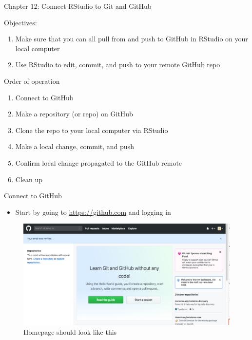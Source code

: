 \documentclass[
  ignorenonframetext,
]{beamer}
\providecommand{\tightlist}{%
  \setlength{\itemsep}{0pt}\setlength{\parskip}{0pt}}
\begin{document}
\begin{frame}{Chapter 12: Connect RStudio to Git and GitHub}
\protect\hypertarget{chapter-12-connect-rstudio-to-git-and-github}{}

\begin{block}{Objectives:}

\begin{enumerate}
\tightlist
\item
  Make sure that you can all pull from and push to GitHub in RStudio on
  your local computer
\item
  Use RStudio to edit, commit, and push to your remote GitHub repo
\end{enumerate}

\end{block}

\begin{block}{Order of operation}

\begin{enumerate}
\tightlist
\item
  Connect to GitHub
\item
  Make a repository (or repo) on GitHub
\item
  Clone the repo to your local computer via RStudio
\item
  Make a local change, commit, and push
\item
  Confirm local change propagated to the GitHub remote
\item
  Clean up
\end{enumerate}

\end{block}

\end{frame}

\begin{frame}{Connect to GitHub}
\protect\hypertarget{connect-to-github}{}

\begin{itemize}
\tightlist
\item
  Start by going to \url{https://github.com} and logging in
\end{itemize}

\begin{figure}
\centering
\includegraphics{pres_figs/homepage.png}
\caption{Homepage should look like this}
\end{figure}

\end{frame}
\end{document}
